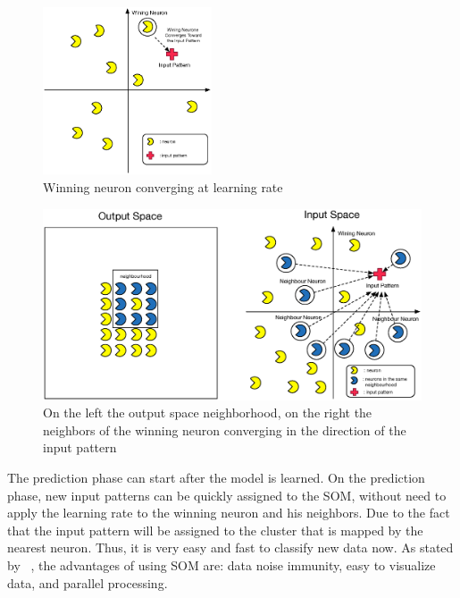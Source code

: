 



\begin{figure}
  \begin{center}
    \includegraphics[width=5cm]{images/4_wining_neuron_converge.eps}
  \end{center}
  \caption{ Winning neuron converging at learning rate }
  \label{fig:4_wining_neuron_converge}
\end{figure}

\begin{figure}
  \begin{center}
    \includegraphics[width=12cm]{images/5_neighbours_converge.eps}
  \end{center}
  \caption{ On the left the output space neighborhood, on the right the neighbors of the winning neuron converging in the direction of the input pattern }
  \label{fig:5_neighbours_converge}
\end{figure}

The prediction phase can start after the model is learned. On the prediction phase, new input patterns can be quickly assigned to the \ac{SOM}, without need to apply the learning rate to the winning neuron and his neighbors. Due to the fact that the input pattern will be assigned to the cluster that is mapped by the nearest neuron. Thus, it is very easy and fast to classify new data now. As stated by ~\citet{Liu2012b}, the advantages of using \ac{SOM} are: data noise immunity, easy to visualize data, and parallel processing.

